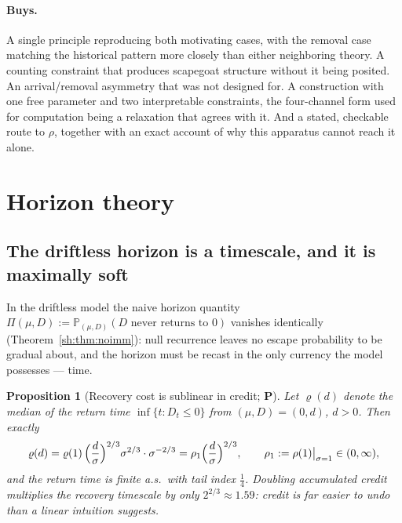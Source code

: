 \documentclass[11pt]{article}
\numberwithin{equation}{section}
\theoremstyle{plain}
\newtheorem{proposition}[theorem]{Proposition}
\theoremstyle{definition}
\theoremstyle{remark}
\newcommand{\PP}{\mathbb{P}}
\begin{document}
\paragraph{Buys.} A single principle reproducing both motivating cases,
with the removal case matching the historical pattern more closely than
either neighboring theory. A counting constraint that produces
scapegoat structure without it being posited. An arrival/removal
asymmetry that was not designed for. A construction with one free
parameter and two interpretable constraints, the four-channel form used
for computation being a relaxation that agrees with it. And a stated,
checkable route to $\rho$, together with an exact account of why this
apparatus cannot reach it alone.


\appendix

\section{Horizon theory}\label{app:horizon}

\label{sh:sub:horizon}

\subsection{The driftless horizon is a timescale, and it is maximally
soft}\label{sh:subsub:softhorizon}

In the driftless model the naive horizon quantity
$\Pi(\mu,D):=\PP_{(\mu,D)}(D\text{ never returns to }0)$ vanishes
identically (Theorem~\ref{sh:thm:noimm}): null recurrence leaves no escape
probability to be gradual about, and the horizon must be recast in the only
currency the model possesses --- time.

\begin{proposition}[Recovery cost is sublinear in credit; \textbf{P}]
\label{sh:prop:recovery}
Let $\varrho(d)$ denote the median of the return time
$\inf\{t:D_t\le0\}$ from $(\mu,D)=(0,d)$, $d>0$. Then exactly
\begin{equation}\label{sh:eq:recovery}
\varrho(d)=\varrho(1)\,\Bigl(\frac d\sigma\Bigr)^{2/3}\sigma^{2/3}\cdot
\sigma^{-2/3}=\rho_1\Bigl(\frac d\sigma\Bigr)^{2/3},
\qquad \rho_1:=\rho(1)\big|_{\sigma=1}\in(0,\infty),
\end{equation}
and the return time is finite a.s.\ with tail index $\tfrac14$. Doubling
accumulated credit multiplies the recovery timescale by only
$2^{2/3}\approx1.59$: credit is far easier to undo than a linear intuition
suggests.
\end{proposition}
\end{document}
